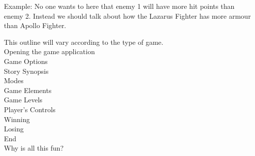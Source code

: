 Example: No one wants to here that enemy 1 will have more hit points than enemy 2. Instead we should talk about how the Lazarus Fighter has more armour than Apollo Fighter.

This outline will vary according to the type of game. \\
Opening the game application\\
Game Options \\
Story Synopsis\\
Modes\\
Game Elements\\
Game Levels\\
Player’s Controls\\
Winning\\
Losing\\
End\\
Why is all this fun?\\
\\





